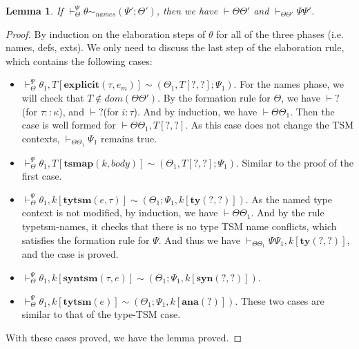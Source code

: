 \documentclass[letterpaper, notitlepage]{article}
\newtheorem{lemma}{Lemma}
\begin{document}
\begin{lemma}
If $\vdash_{\Theta}^{\Psi}\theta\sim_{names}(\Psi';\Theta')$, then we have $\vdash\Theta\Theta'$ and $\vdash_{\Theta\Theta'}\Psi\Psi'$.
\end{lemma}
\begin{proof}
By induction on the elaboration steps of $\theta$ for all of the three phases (i.e. names, defs, exts). We only need to discuss the last step of the elaboration rule, which contains the following cases:
\begin{itemize}
\item $\vdash_{\Theta}^{\Psi}\theta_1,T[\mathbf{explicit}(\tau,e_m)] \sim (\Theta_1,T[?,?];\Psi_1)$. For the names phase, we will check that $T\notin dom(\Theta\Theta')$. By the formation rule for $\Theta$, we have $\vdash ?$ (for $\tau::\kappa$), and $\vdash ?$(for $i:\tau$). And by induction, we have $\vdash\Theta\Theta_1$. Then the case is well formed for $\vdash\Theta\Theta_1,T[?,?]$. As this case does not change the TSM contexts, $\vdash_{\Theta\Theta_1}\Psi_1$ remains true.
\item$\vdash_{\Theta}^{\Psi}\theta_1,T[\mathbf{tsmap}(k,body)] \sim (\Theta_1,T[?,?];\Psi_1)$. Similar to the proof of the first case.
\item $\vdash_{\Theta}^{\Psi}\theta_1,k[\mathbf{tytsm}(e,\tau)] \sim (\Theta_1;\Psi_1,k[\mathbf{ty}(?,?)])$. As the named type context is not modified, by induction, we have $\vdash\Theta\Theta_1$. And by the rule typetsm-names, it checks that there is no type TSM name conflicts, which satisfies the formation rule for $\Psi$. And thus we have $\vdash_{\Theta\Theta_1}\Psi\Psi_1,k[\mathbf{ty}(?,?)]$, and the case is proved.
\item $\vdash_{\Theta}^{\Psi}\theta_1,k[\mathbf{syntsm}(\tau,e)] \sim (\Theta_1;\Psi_1,k[\mathbf{syn}(?,?)])$.
\item $\vdash_{\Theta}^{\Psi}\theta_1,k[\mathbf{tytsm}(e)] \sim (\Theta_1;\Psi_1,k[\mathbf{ana}(?)])$. These two cases are similar to that of the type-TSM case.
\end{itemize}
With these cases proved, we have the lemma proved.
\end{proof}
\end{document}
